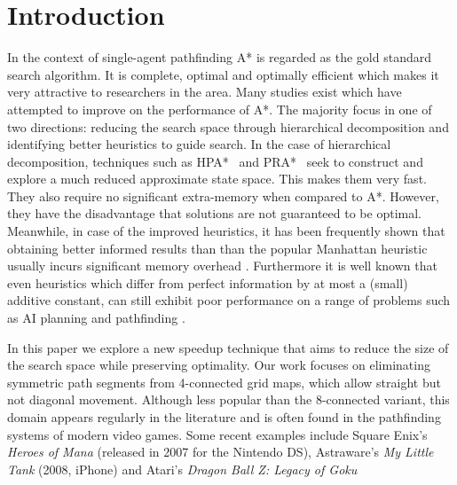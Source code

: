 \section{Introduction}
In the context of single-agent pathfinding A* \cite{hart68} is regarded as 
the gold standard search algorithm.
It is complete, optimal and optimally efficient which makes it very attractive 
to researchers in the area.
Many studies exist which have attempted to improve on the performance of A*.
The majority focus in one of two directions: reducing the search space through hierarchical 
decomposition and identifying better heuristics to guide search. 
In the case of hierarchical decomposition, techniques such as
HPA*~\cite{botea04} and PRA*~\cite{sturtevant05} seek to construct and explore
a much reduced approximate state space.
This makes them very fast. 
They also require no significant extra-memory when compared to A*.
However, they have the disadvantage that solutions are not guaranteed to be optimal.
Meanwhile, in case of the improved heuristics, it has been frequently shown
that obtaining better informed results than than the popular
Manhattan heuristic usually incurs significant memory overhead 
\cite{sturtevant09,goldberg05,Cazenave:06,bjornsson06}.
Furthermore it is well known that even heuristics which differ from perfect information 
by at most a (small) additive constant, can still exhibit poor performance on a range of 
problems such as AI planning and pathfinding \cite{helmert08,pohl77}.
\par
In this paper we explore a new speedup technique that aims to reduce the size of the search 
space while preserving optimality.
Our work focuses on eliminating symmetric path segments from 4-connected grid maps,
which allow straight but not diagonal movement. 
Although less popular than the 8-connected variant, this domain appears regularly in the 
literature  \cite{yap02,wang08,pochter09} and is often found in the pathfinding systems of modern video games.
Some recent examples include Square Enix's \emph{Heroes of Mana} (released in
2007 for the Nintendo DS),
Astraware's \emph{My Little Tank} (2008, iPhone) and Atari's \emph{Dragon Ball Z: Legacy of Goku} 
